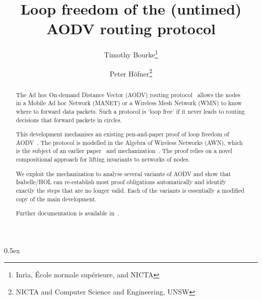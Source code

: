 \documentclass[11pt,a4paper]{report}
\begin{document}
\title{Loop freedom of the (untimed) AODV routing protocol}
\author{Timothy Bourke\thanks{Inria,
                              \'Ecole normale sup\'erieure,
                              and NICTA}
        \and
        Peter H\"ofner\thanks{NICTA
                              and Computer Science and Engineering, UNSW}}
\maketitle

\begin{abstract}
The Ad hoc On-demand Distance Vector (AODV) routing protocol~\cite{RFC3561} 
allows the nodes in a Mobile Ad hoc Network (MANET) or a Wireless Mesh 
Network (WMN) to know where to forward data packets. Such a protocol is 
`loop free' if it never leads to routing decisions that forward packets in 
circles.

This development mechanises an existing pen-and-paper proof of loop freedom 
of AODV~\cite{FehnkerEtAl:AWN:2013}.
The protocol is modelled in the Algebra of Wireless Networks (AWN),
which is the subject of an earlier paper~\cite{BourkeEtAl:MechAWN:2014} and 
mechanization~\cite{Bourke14}.
The proof relies on a novel compositional approach for lifting invariants to 
networks of nodes.

We exploit the mechanization to analyse several variants of AODV and show 
that Isabelle/HOL can re-establish most proof obligations automatically and 
identify exactly the steps that are no longer valid.
Each of the variants is essentially a modified copy of the main development.

Further documentation is available in~\cite{BourkevGlHof:ATVA:2014}.

\end{abstract}

\newpage
\tableofcontents

\parindent 0pt\parskip 0.5ex

\newpage




\end{document}
